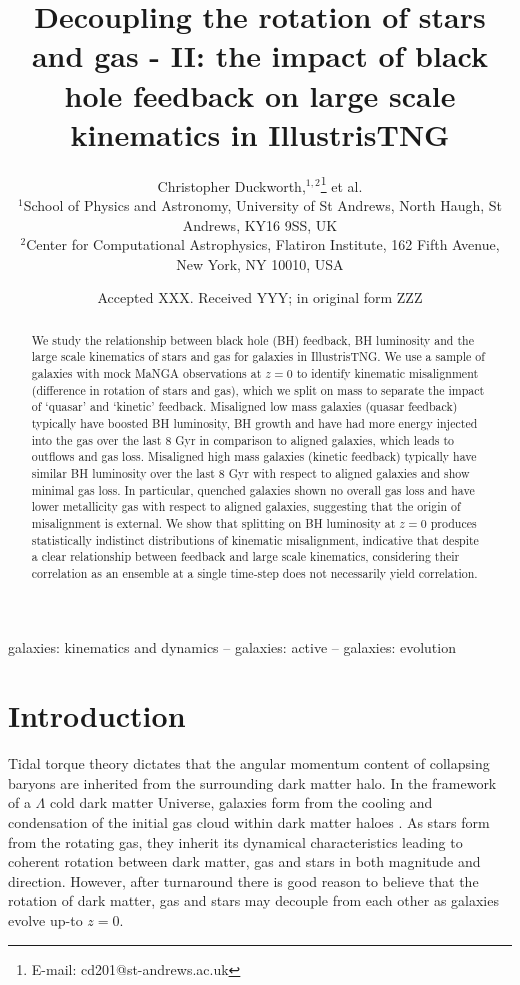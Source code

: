 \documentclass[fleqn,usenatbib]{mnras}
\title[Decoupling the rotation of stars and gas - II]{Decoupling the rotation of stars and gas - II: the impact of black hole feedback on large scale kinematics in IllustrisTNG}
\author[C. Duckworth et al.]{Christopher Duckworth,$^{1,2}$\thanks{E-mail: cd201@st-andrews.ac.uk}
et al.
\\
$^{1}$School of Physics and Astronomy, University of St Andrews, North Haugh, St Andrews, KY16 9SS, UK\\
$^{2}$Center for Computational Astrophysics, Flatiron Institute, 162 Fifth Avenue, New York, NY 10010, USA\\
}
\date{Accepted XXX. Received YYY; in original form ZZZ}
\begin{document}
\label{firstpage}
\pagerange{\pageref{firstpage}--\pageref{lastpage}}
\maketitle

\begin{abstract}
We study the relationship between black hole (BH) feedback, BH luminosity and the large scale kinematics of stars and gas for galaxies in IllustrisTNG. We use a sample of galaxies with mock MaNGA observations at $z=0$ to identify kinematic misalignment (difference in rotation of stars and gas), which we split on mass to separate the impact of `quasar' and `kinetic' feedback. 
Misaligned low mass galaxies (quasar feedback) typically have boosted BH luminosity, BH growth and have had more energy injected into the gas over the last 8 Gyr in comparison to aligned galaxies, which leads to outflows and gas loss.
Misaligned high mass galaxies (kinetic feedback) typically have similar BH luminosity over the last 8 Gyr with respect to aligned galaxies and show minimal gas loss. In particular, quenched galaxies shown no overall gas loss and have lower metallicity gas with respect to aligned galaxies, suggesting that the origin of misalignment is external.
We show that splitting on BH luminosity at $z=0$ produces statistically indistinct distributions of kinematic misalignment, indicative that despite a clear relationship between feedback and large scale kinematics, considering their correlation as an ensemble at a single time-step does not necessarily yield correlation.
\end{abstract}

\begin{keywords}
galaxies: kinematics and dynamics -- galaxies: active -- galaxies: evolution
\end{keywords}



\section{Introduction}
Tidal torque theory \citep[][]{hoyle1951, peebles1969, Doroshkevich1970} dictates that the angular momentum content of collapsing baryons are inherited from the surrounding dark matter halo. In the framework of a $\Lambda$ cold dark matter Universe, galaxies form from the cooling and condensation of the initial gas cloud within dark matter haloes \citep{fall1980, mo1998}. As stars form from the rotating gas, 
they inherit its dynamical characteristics leading to coherent rotation between dark matter, gas and stars in both magnitude and direction. However, after turnaround there is good reason to believe that the rotation of dark matter, gas and stars may decouple from each other as galaxies evolve up-to $z=0$. 
\end{document}
